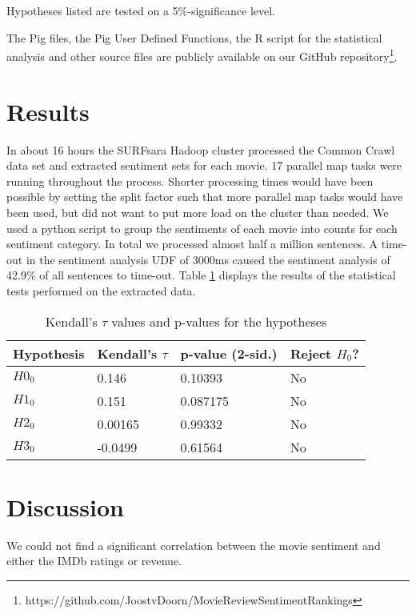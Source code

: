 \documentclass{sig-alternate-br}
\begin{document}
Hypotheses listed are tested on a 5\%-significance level.

The Pig files, the Pig User Defined Functions, the R script for the statistical analysis and other source files are publicly available on our GitHub repository\footnote{https://github.com/JoostvDoorn/MovieReviewSentimentRankings}.

\section{Results}
In about 16 hours the SURFsara Hadoop cluster processed the Common Crawl data set and extracted sentiment sets for each movie. 17 parallel map tasks were running throughout the process. Shorter processing times would have been possible by setting the split factor such that more parallel map tasks would have been used, but did not want to put more load on the cluster than needed. We used a python script to group the sentiments of each movie into counts for each sentiment category. In total we processed almost half a million sentences. A time-out in the sentiment analysis UDF of 3000ms caused the sentiment analysis of 42.9\% of all sentences to time-out. Table \ref{tab:hypothesis_tests} displays the results of the statistical tests performed on the extracted data.
\begin{table}[!h!p]
\begin{tabular}{l|lll}
Hypothesis & Kendall's $\tau$ & p-value (2-sid.) & Reject $H_0$?\\
\hline
$H0_0$ & 0.146 & 0.10393 & No \\ 
$H1_0$ & 0.151 & 0.087175 & No \\ 
$H2_0$ & 0.00165 & 0.99332 & No \\ 
$H3_0$ & -0.0499 & 0.61564 & No\\ 
\end{tabular}
\caption{Kendall's $\tau$ values and p-values for the hypotheses}
\label{tab:hypothesis_tests}
\end{table}

\section{Discussion}
We could not find a significant correlation between the movie sentiment and either the IMDb ratings or revenue.
\end{document}
